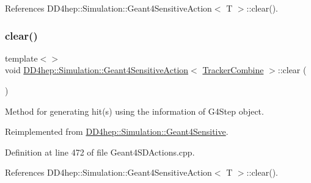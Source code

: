References D\+D4hep\+::\+Simulation\+::\+Geant4\+Sensitive\+Action$<$ T $>$\+::clear().

\hypertarget{class_d_d4hep_1_1_simulation_1_1_geant4_sensitive_action_ad6662339c480efeb52af63c13fe6cc88}{}\label{class_d_d4hep_1_1_simulation_1_1_geant4_sensitive_action_ad6662339c480efeb52af63c13fe6cc88} 
\subsubsection{\texorpdfstring{clear()}{clear()}\hspace{0.1cm}{\footnotesize\ttfamily [2/3]}}
{\footnotesize\ttfamily template$<$$>$ \\
void \hyperlink{class_d_d4hep_1_1_simulation_1_1_geant4_sensitive_action}{D\+D4hep\+::\+Simulation\+::\+Geant4\+Sensitive\+Action}$<$ \hyperlink{struct_d_d4hep_1_1_simulation_1_1_tracker_combine}{Tracker\+Combine} $>$\+::clear (\begin{DoxyParamCaption}\item[{G4\+H\+Cof\+This\+Event $\ast$}]{ }\end{DoxyParamCaption})\hspace{0.3cm}{\ttfamily [virtual]}}



Method for generating hit(s) using the information of G4\+Step object. 



Reimplemented from \hyperlink{class_d_d4hep_1_1_simulation_1_1_geant4_sensitive_a3bb1c2f79261a98e83ec22102281d117}{D\+D4hep\+::\+Simulation\+::\+Geant4\+Sensitive}.



Definition at line 472 of file Geant4\+S\+D\+Actions.\+cpp.



References D\+D4hep\+::\+Simulation\+::\+Geant4\+Sensitive\+Action$<$ T $>$\+::clear().

\hypertarget{class_d_d4hep_1_1_simulation_1_1_geant4_sensitive_action_a52a9e46a54f3e1605637dc281a878b0d}{}\label{class_d_d4hep_1_1_simulation_1_1_geant4_sensitive_action_a52a9e46a54f3e1605637dc281a878b0d} 
